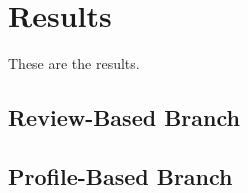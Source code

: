\section{Results}

These are the results.

\subsection{Review-Based Branch}

\subsection{Profile-Based Branch}